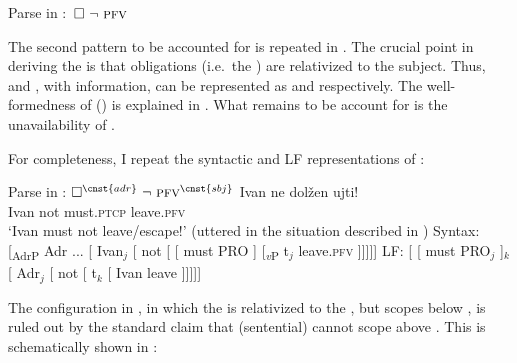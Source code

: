 \documentclass[output=paper,newtxmath,colorlinks,citecolor=brown]{langsci/langscibook}
\begin{document}
\ea  Parse in :  $\,\Box\ \neg\ \textsc{pfv\ }$ \label{detailsp1d}
	\z \z

\noindent The second pattern to be accounted for is repeated in . The crucial point in deriving the 
is that obligations (i.e.\ the ) are relativized to the subject. Thus,  and , with  information, can be represented as  and  respectively. The well-formedness of  () is explained in . What remains to be account for is  the unavailability of .

\label{pattern2}
\z \z

\noindent For completeness, I repeat the syntactic and LF representations of :

\newpage

\ea Parse in :  $\Box^{\cnst{adr}}\ \neg\ \textsc{pfv}^{\cnst{sbj}}$ \label{detailsp2d}
	\ea \gll  Ivan ne dolžen ujti! \\
	Ivan  not must.\textsc{ptcp} leave.\textsc{pfv} \\
	\glt `Ivan must not leave/escape!' \hfill (uttered in the situation described in )
	\ex Syntax:  [\textsubscript{AdrP} Adr ...  [ Ivan$_j$  [ not [ [ must PRO ] [\textsubscript{\textit{v}P} t$_j$ leave.\textsc{pfv} ]]]]]
	\ex LF:  [ [ must PRO$_j$ ]$_k$ [ Adr$_j$ [ not [ t$_k$ [ Ivan leave  ]]]]]
        \z \z

\noindent The configuration in , in which the  is relativized to the , but scopes below , is ruled out by the standard claim that (sentential)  cannot scope above  . This is schematically shown in :
\end{document}
